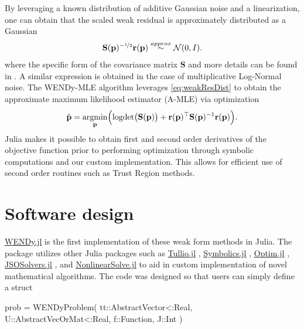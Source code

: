 \documentclass{juliacon}
\newcommand{\params}{\mathbf{p}}
\DeclareMathOperator{\logdet}{logdet}
\DeclareMathOperator{\argmin}{argmin}
\begin{document}
By leveraging a known distribution of additive Gaussian noise and a linearization, one can obtain that the scaled weak residual is approximately distributed as a Gaussian 
\begin{equation}\label{eq:weakResDist}
   \mathbf{S}(\params)^{-\nicefrac{1}{2}} \mathbf{r}(\params) \stackrel{approx}{\sim} \mathcal{N}(0, I).
\end{equation}
where the specific form of the covariance matrix $\mathbf{S}$ and more details can be found in \citep{RummelMessengerBeckerEtAl2025arXiv250208881b}. A similar expression is obtained in the case of multiplicative Log-Normal noise. The WENDy-MLE algorithm leverages \cref{eq:weakResDist} to obtain the approximate maximum likelihood estimator (A-MLE) via optimization
\begin{equation}\label{eq:mle}
    \hat{\params} = \underset{\params}{\argmin}\Bigl( \logdet\bigl(\mathbf{S}(\params)\bigr) + \mathbf{r}(\params)^\top \mathbf{S}(\params)^{-1}\mathbf{r}(\params)\Bigr).
\end{equation}
Julia makes it possible to obtain first and second order derivatives of the objective function prior to performing optimization through symbolic computations and our custom implementation. This allows for efficient use of second order routines such as Trust Region methods. 

\section{Software design}

\href{https://github.com/nrummel/WENDy.jl}{WENDy.jl} \citep{RummelMessengerBeckerEtAl2025arXiv250208881b} is the first implementation of these weak form methods in Julia. The package utilizes  other Julia packages such as \href{https://github.com/mcabbott/Tullio.jl}{Tullio.jl} \citep{Michael2026},  \href{https://github.com/JuliaSymbolics/Symbolics.jl}{Symbolics.jl} \citep{GowdaMaCheliEtAl2021ACMCommunComputAlgebra}, \href{https://github.com/SciML/Optim.jl}{Optim.jl} \citep{KMogensenNRiseth2018JOSS}, \href{https://github.com/JuliaSmoothOptimizers/JSOSolvers.jl}{JSOSolvers.jl} \citep{MigotOrbanSoaresSiqueira2024}, and \href{https://github.com/SciML/NonlinearSolve.jl}{NonlinearSolve.jl} \citep{PalHoltorfLarssonEtAl2024arXiv240316341} to aid in custom implementation of novel mathematical algorithms. The code was designed so that users can simply define a struct
\begin{jllisting}
    prob = WENDyProblem(
        tt::AbstractVector{<:Real}, 
        U::AbstractVecOrMat{<:Real}, 
        f::Function, 
        J::Int
    )
\end{jllisting}
\end{document}
